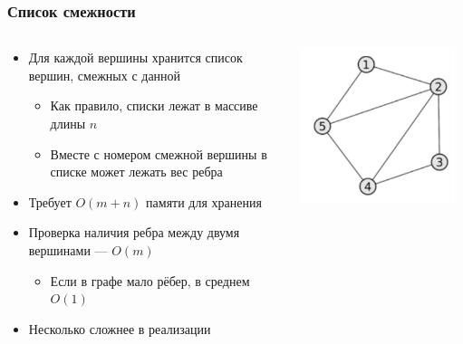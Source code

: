 \documentclass[xetex,mathserif,serif]{beamer}
\begin{document}
    \begin{frame}
        \frametitle{Список смежности}
        \begin{columns}
            \begin{column}{0.65\textwidth}
                \begin{itemize}
                    \item Для каждой вершины хранится список вершин, смежных с данной
                    \begin{itemize}
                        \item Как правило, списки лежат в массиве длины $n$
                        \item Вместе с номером смежной вершины в списке может лежать вес ребра
                    \end{itemize}
                    \item Требует $O(m + n)$ памяти для хранения
                    \item Проверка наличия ребра между двумя вершинами --- $O(m)$
                    \begin{itemize}
                        \item Если в графе мало рёбер, в среднем $O(1)$
                    \end{itemize}
                    \item Несколько сложнее в реализации
                \end{itemize}
            \end{column}
            \begin{column}{0.35\textwidth}
                \begin{center}
                    \includegraphics[width=0.95\textwidth]{adjacency-list.png}

\end{center}
\end{column}
\end{columns}
\end{frame}
\end{document}
